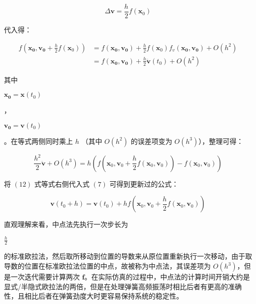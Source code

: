 \documentclass[UTF8]{ctexart}
\begin{document}
\begin{large}
\begin{equation}
\Delta \mathbf{v} = \frac{h}{2} f(\mathbf{x}_0)
\end{equation}
\end{large}

代入得：

\begin{large}
\begin{equation}
\begin{split}
f(\mathbf{x_0}, \mathbf{v_0} + \frac{h}{2} f(\mathbf{x}_0)) &= f(\mathbf{x_0}, \mathbf{v_0}) + \frac{h}{2} f(\mathbf{x}_0) f_v(\mathbf{x_0}, \mathbf{v_0}) + O(h^2) \\ &= f(\mathbf{x_0}, \mathbf{v_0}) + \frac{h}{2} \ddot{\mathbf{v}}(t_0) + O(h^2)
\end{split}
\end{equation}
\end{large}

其中 \begin{large} $\mathbf{x_0} = \mathbf{x}(t_0)$ \end{large}，\begin{large} $\mathbf{v_0} = \mathbf{v}(t_0)$ \end{large}。在等式两侧同时乘上 $h$ （其中 $O(h^2)$ 的误差项变为 $O(h^3)$），整理可得：

\begin{large}
\begin{equation}
\frac{h^2}{2} \ddot{\mathbf{v}} + O(h^3) = h(f(\mathbf{x}_0, \mathbf{v}_0 + \frac{h}{2} f(\mathbf{x}_0, \mathbf{v}_0)) - f(\mathbf{x}_0, \mathbf{v}_0))
\end{equation}
\end{large}

将 $(12)$ 式等式右侧代入式 $(7)$ 可得到更新过的公式：

\begin{large}
\begin{equation}
\mathbf{v}(t_0 + h) = \mathbf{v}(t_0) + hf(\mathbf{x}_0, \mathbf{v}_0 + \frac{h}{2} f(\mathbf{x}_0, \mathbf{v}_0))
\end{equation}
\end{large}

直观理解来看，中点法先执行一次步长为\begin{large} $\frac{h}{2}$\end{large}的标准欧拉法，然后取所移动到位置的导数来从原位置重新执行一次移动，由于取导数的位置在标准欧拉法位置的中点，故被称为中点法，其误差项为 $O(h^3)$，但是一次迭代需要计算两次 $\mathbf{f}$。在实际仿真的过程中，中点法的计算时间开销大约是显式/半隐式欧拉法的两倍，但是在处理弹簧高频振荡时相比后者有更高的准确性，且相比后者在弹簧劲度大时更容易保持系统的稳定性。
\end{document}
